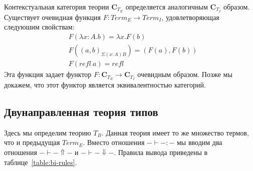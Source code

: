 \documentclass{amsart}
\theoremstyle{definition}
\theoremstyle{remark}
\newcommand{\cat}[1]{\mathbf{#1}}
\renewcommand{\C}{\cat{C}}
\numberwithin{figure}{section}
\begin{document}
Контекстуальная категория теории $\C_{T_E}$ определяется аналогичным $\C_{T_I}$ образом.
Существует очевидная функция $F : Term_E \to Term_I$, удовлетворяющая следуюшим свойствам:
\begin{align*}
& F(\lambda x : A. b) = \lambda x. F(b) \\
& F((a, b)_{\Sigma (x : A) B}) = (F(a), F(b)) \\
& F(refl\ a) = refl
\end{align*}
Эта функция задает функтор $F : \C_{T_E} \to \C_{T_I}$ очевидным образом.
Позже мы докажем, что этот функтор является эквивалентностью категорий.

\subsection{Двунаправленная теория типов}

Здесь мы определим теорию $T_B$.
Данная теория имеет то же множество термов, что и предыдущая $Term_E$.
Вместо отношения $- \vdash - : -$ мы вводим два отношения $- \vdash - \Uparrow -$ и $- \vdash - \Downarrow -$.
Правила вывода приведены в таблице~\ref{table:bi-rules}.
\end{document}
